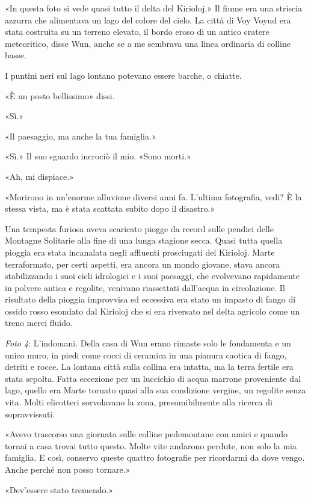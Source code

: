 «In questa foto si vede quasi tutto il delta del Kirioloj.» Il fiume era
una striscia azzurra che alimentava un lago del colore del cielo. La
città di Voy Voyud era stata costruita su un terreno elevato, il bordo
eroso di un antico cratere meteoritico, disse Wun, anche se a me
sembrava una linea ordinaria di colline basse.

I puntini neri sul lago lontano potevano essere barche, o chiatte.

«È un posto bellissimo» dissi.

«Sì.»

«Il paesaggio, ma anche la tua famiglia.»

«Sì.» Il suo sguardo incrociò il mio. «Sono morti.»

«Ah, mi dispiace.»

«Morirono in un'enorme alluvione diversi anni fa. L'ultima fotografia,
vedi? È la stessa vista, ma è stata scattata subito dopo il disastro.»

Una tempesta furiosa aveva scaricato piogge da record sulle pendici
delle Montagne Solitarie alla fine di una lunga stagione secca. Quasi
tutta quella pioggia era stata incanalata negli affluenti prosciugati
del Kirioloj. Marte terraformato, per certi aspetti, era ancora un mondo
giovane, stava ancora stabilizzando i suoi cicli idrologici e i suoi
paesaggi, che evolvevano rapidamente in polvere antica e regolite,
venivano riassettati dall'acqua in circolazione. Il risultato della
pioggia improvvisa ed eccessiva era stato un impasto di fango di ossido
rosso esondato dal Kirioloj che si era riversato nel delta agricolo come
un treno merci fluido.

\emph{Foto 4}: L'indomani. Della casa di Wun erano rimaste solo le
fondamenta e un unico muro, in piedi come cocci di ceramica in una
pianura caotica di fango, detriti e rocce. La lontana città sulla
collina era intatta, ma la terra fertile era stata sepolta. Fatta
eccezione per un luccichio di acqua marrone proveniente dal lago, quello
era Marte tornato quasi alla sua condizione vergine, un regolite senza
vita. Molti elicotteri sorvolavano la zona, presumibilmente alla ricerca
di sopravvissuti.

«Avevo trascorso una giornata sulle colline pedemontane con amici e
quando tornai a casa trovai tutto questo. Molte vite andarono perdute,
non solo la mia famiglia. E così, conservo queste quattro fotografie per
ricordarmi da dove vengo. Anche perché non posso tornare.»

«Dev'essere stato tremendo.»

